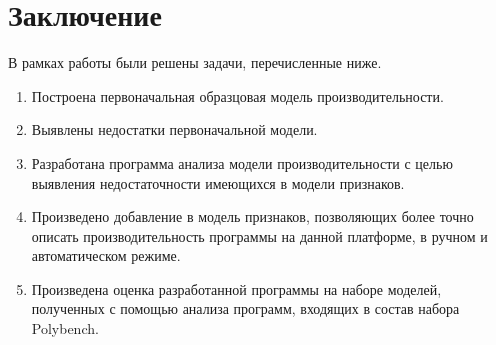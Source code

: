 \section{Заключение}
В рамках работы были решены задачи, перечисленные ниже.
\begin{enumerate}
	\item Построена первоначальная образцовая модель производительности.
	\item Выявлены недостатки первоначальной модели.
	\item Разработана программа анализа модели производительности с целью выявления недостаточности имеющихся в модели признаков.
	\item Произведено добавление в модель признаков, позволяющих более точно описать производительность программы на данной платформе, в ручном и автоматическом режиме.
	\item Произведена оценка разработанной программы на наборе моделей, полученных с помощью анализа программ, входящих в состав набора Polybench.
\end{enumerate}